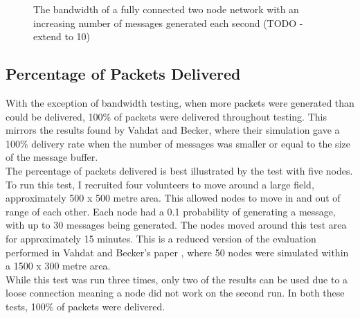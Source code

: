 \documentclass[12pt,a4paper]{report}
\makeatletter
\newenvironment{figurehere}
  {\def\@captype{figure}}
  {}
\makeatother
\begin{document}
\begin{figurehere}
\begin{center}
\end{center}
\caption{The network used for bandwidth testing}
\end{figurehere}

\begin{figure}
\begin{center}

\end{center}
\caption{The bandwidth of a fully connected two node network with an increasing number of messages generated each second (TODO - extend to 10)}
\end{figure}

\subsection{Percentage of Packets Delivered}
With the exception of bandwidth testing, when more packets were generated than could be delivered, 100\% of packets were delivered throughout testing. This mirrors the results found by Vahdat and Becker, where their simulation gave a 100\% delivery rate when the number of messages was smaller or equal to the size of the message buffer. \\
The percentage of packets delivered is best illustrated by the test with five nodes. To run this test, I recruited four volunteers to move around a large field, approximately 500 x 500 metre area. This allowed nodes to move in and out of range of each other. Each node had a 0.1 probability of generating a message, with up to 30 messages being generated. The nodes moved around this test area for approximately 15 minutes. This is a reduced version of the evaluation performed in Vahdat and Becker's paper \cite{epidemic}, where 50 nodes were simulated within a 1500 x 300 metre area. \\
While this test was run three times, only two of the results can be used due to a loose connection meaning a node did not work on the second run. In both these tests, 100\% of packets were delivered.
\end{document}
